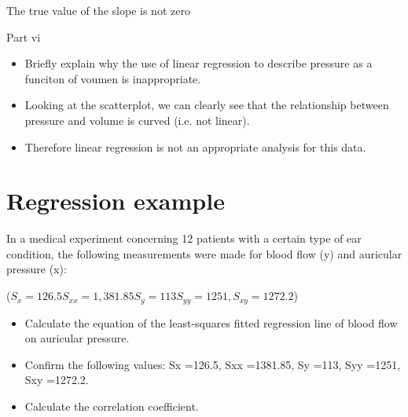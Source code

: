 \documentclass[]{report}
\begin{document}
The true value of the slope is not zero






Part vi
\begin{itemize}
	\item Briefly explain why the  use of linear regression to describe pressure as a funciton of voumen is inappropriate.
	
	\item Looking at the scatterplot, we can clearly see that the relationship between pressure and volume is curved (i.e. not linear). 
	
	\item Therefore linear regression is not an appropriate analysis for this data.
\end{itemize}


	
	
	

	
	\section{Regression example}
	
	In a medical experiment concerning 12 patients with a certain type of ear condition,
	the following measurements were made for blood flow (y) and auricular pressure (x):
	
	
	($S_x =126.5 S_{xx} =1,381.85 S_y =113 S_{yy} =1251, S_{xy} =1272.2$)
	
	
	\begin{itemize}
		\item Calculate the equation of the least-squares fitted regression line of blood flow
		on auricular pressure.
		\item Confirm the following values: Sx =126.5, Sxx =1381.85, Sy =113, Syy =1251, Sxy =1272.2.
		\item Calculate the correlation coefficient.
		
	\end{itemize}
	
	
\end{document}
